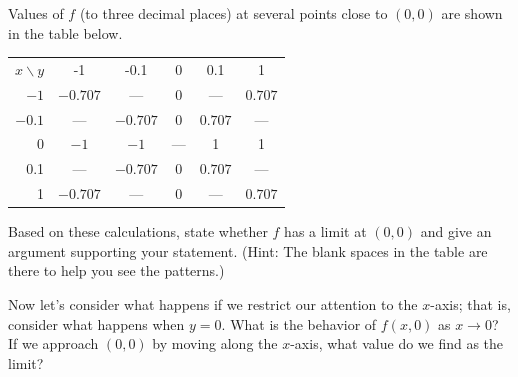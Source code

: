 \begin{activity}
\item Values of $f$ (to three decimal places) at several points close to
  $(0,0)$ are shown in the table below. 
  \begin{center}
    \begin{tabular}{|r||c|c|c|c|c|}
      \hline
      $x\backslash y$ & -1 & -0.1 & 0 & 0.1 & 1 \\       \hhline{|=|=|=|=|=|=|}
      $-1$ & $-0.707$ & --- & 0 & ---  & $0.707$ \\       \hline
      $-0.1$ & --- & $-0.707$ & 0 & $0.707$ &  --- \\       \hline
      0 &$-1$ &$-1$ &--- &1 &1 \\       \hline
      0.1 & --- &$-0.707$ &0 &$0.707$ & --- \\       \hline
      1 &$-0.707$ &--- &0 &--- & $0.707$\\       \hline
    \end{tabular}
  \end{center}
  
  Based on these calculations, state whether $f$ has a limit at
  $(0,0)$ and give an argument supporting your statement. (Hint: The blank spaces in the table are there to help you see the patterns.)
	
\item Now let's consider what happens if we restrict our attention to
  the $x$-axis;  that is, consider what happens when $y = 0$.  
  What is the behavior of $f(x,0)$ as $x \to 0$?  If we approach
  $(0,0)$ by moving along the $x$-axis, what value do we find as the
  limit?  


\end{activity}
